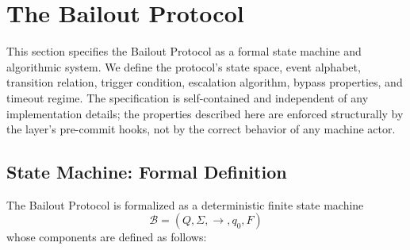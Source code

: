 \section{The Bailout Protocol}\label{sec:bailout-protocol}

This section specifies the Bailout Protocol as a formal state machine and algorithmic system. We define the protocol's state space, event alphabet, transition relation, trigger condition, escalation algorithm, bypass properties, and timeout regime. The specification is self-contained and independent of any implementation details; the properties described here are enforced structurally by the \fact{} layer's pre-commit hooks, not by the correct behavior of any machine actor.

\subsection{State Machine: Formal Definition}
\label{sec:state-machine}

The Bailout Protocol is formalized as a deterministic finite state machine
\[\mathcal{B} = (Q, \Sigma, \rightarrow, q_0, F)\]
whose components are defined as follows:

